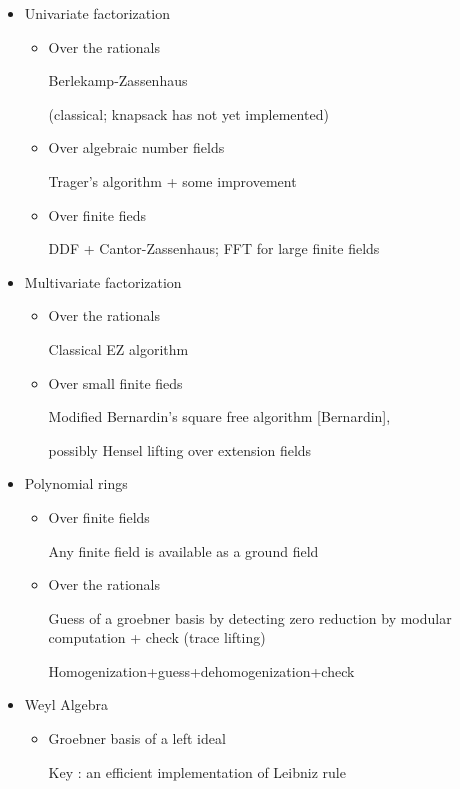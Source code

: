 \begin{slide}{}
\begin{itemize}
\item Univariate factorization

\begin{itemize}
\item Over the rationals

Berlekamp-Zassenhaus

(classical; knapsack has not yet implemented)

\item Over algebraic number fields

Trager's algorithm + some improvement

\item Over finite fieds

DDF + Cantor-Zassenhaus; FFT for large finite fields
\end{itemize}

\item Multivariate factorization

\begin{itemize}
\item Over the rationals

Classical EZ algorithm

\item Over small finite fieds

Modified Bernardin's square free algorithm [Bernardin],

possibly Hensel lifting over extension fields
\end{itemize}

\end{itemize}
\end{slide}

\begin{slide}{}
\begin{itemize}
\item Polynomial rings
\begin{itemize}
\item Over finite fields

Any finite field is available as a ground field

\item Over the rationals

Guess of a groebner basis by detecting zero reduction by modular computation
+ check (trace lifting)

Homogenization+guess+dehomogenization+check
\end{itemize}

\item Weyl Algebra

\begin{itemize}
\item Groebner basis of a left ideal

Key : an efficient implementation of Leibniz rule
\end{itemize}

\end{itemize}
\end{slide}

